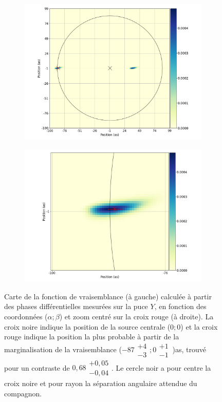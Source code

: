 \begin{figure}[ht!]
    \centering
    \begin{subfigure}{0.5\textwidth}
        \centering
        \includegraphics[width=\textwidth]{Figure_Chap4/20221010_Bin01_SpeDiffPhase_FitLikeli_Map_Pola1_LaTex.png}
    \end{subfigure}%
    \begin{subfigure}{0.5\textwidth}
        \centering
        \includegraphics[width=\textwidth]{Figure_Chap4/20221010_Bin01_SpeDiffPhase_FitLikeli_MapZoom_Pola1_LaTex.png}
    \end{subfigure}
    \caption[Carte de la fonction de vraisemblance calculée à partir des phases différentielles mesurées sur la puce $Y$.]{Carte de la fonction de vraisemblance (à gauche) calculée à partir des phases différentielles mesurées sur la puce $Y$, en fonction des coordonnées ($\alpha; \beta$) et zoom centré sur la croix rouge (à droite). La croix noire indique la position de la source centrale ($0; 0$) et la croix rouge indique la position la plus probable à partir de la marginalisation de la vraisemblance ($-87\substack{+4 \\ -3}; 0\substack{+1 \\ -1} \,$)as, trouvé pour un contraste de $0,68\substack{+0,05 \\ -0,04}$. Le cercle noir a pour centre la croix noire et pour rayon la séparation angulaire attendue du compagnon.}

\end{figure}
